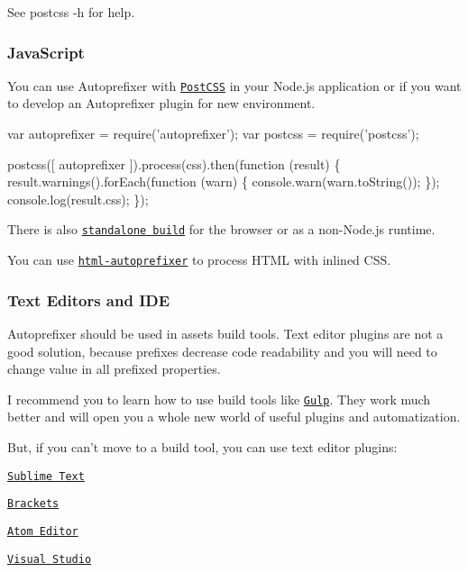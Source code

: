 See {\ttfamily postcss -\/h} for help.

\subsubsection*{Java\+Script}

You can use Autoprefixer with \href{https://github.com/postcss/postcss}{\tt Post\+C\+SS} in your Node.\+js application or if you want to develop an Autoprefixer plugin for new environment.


\begin{DoxyCode}
var autoprefixer = require('autoprefixer');
var postcss      = require('postcss');

postcss([ autoprefixer ]).process(css).then(function (result) \{
    result.warnings().forEach(function (warn) \{
        console.warn(warn.toString());
    \});
    console.log(result.css);
\});
\end{DoxyCode}


There is also \href{https://raw.github.com/ai/autoprefixer-rails/master/vendor/autoprefixer.js}{\tt standalone build} for the browser or as a non-\/\+Node.\+js runtime.

You can use \href{https://github.com/RebelMail/html-autoprefixer}{\tt html-\/autoprefixer} to process H\+T\+ML with inlined C\+SS.

\subsubsection*{Text Editors and I\+DE}

Autoprefixer should be used in assets build tools. Text editor plugins are not a good solution, because prefixes decrease code readability and you will need to change value in all prefixed properties.

I recommend you to learn how to use build tools like \href{http://gulpjs.com/}{\tt Gulp}. They work much better and will open you a whole new world of useful plugins and automatization.

But, if you can’t move to a build tool, you can use text editor plugins\+:


\begin{DoxyItemize}
\item \href{https://github.com/sindresorhus/sublime-autoprefixer}{\tt Sublime Text}
\item \href{https://github.com/mikaeljorhult/brackets-autoprefixer}{\tt Brackets}
\item \href{https://github.com/sindresorhus/atom-autoprefixer}{\tt Atom Editor}
\item \href{http://vswebessentials.com/}{\tt Visual Studio}
\end{DoxyItemize}

